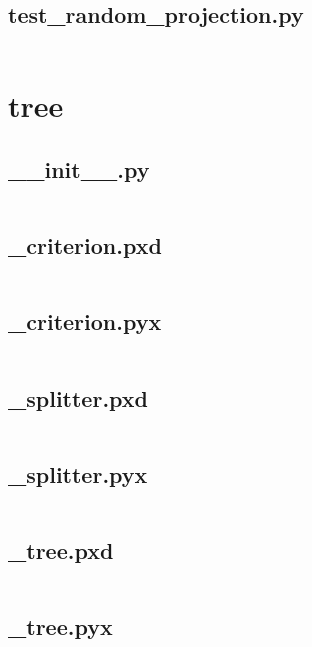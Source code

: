 \documentclass{article}
\begin{document}
\subsection{test\_random\_projection.py}
\inputminted{python}{/home/dufferzafar/dev/@clones/scikit-learn/sklearn/tests/test_random_projection.py}
\newpage

\section{tree}

\subsection{\_\_init\_\_.py}
\inputminted{python}{/home/dufferzafar/dev/@clones/scikit-learn/sklearn/tree/__init__.py}
\newpage

\subsection{\_criterion.pxd}
\inputminted{cython}{/home/dufferzafar/dev/@clones/scikit-learn/sklearn/tree/_criterion.pxd}
\newpage

\subsection{\_criterion.pyx}
\inputminted{cython}{/home/dufferzafar/dev/@clones/scikit-learn/sklearn/tree/_criterion.pyx}
\newpage

\subsection{\_splitter.pxd}
\inputminted{cython}{/home/dufferzafar/dev/@clones/scikit-learn/sklearn/tree/_splitter.pxd}
\newpage

\subsection{\_splitter.pyx}
\inputminted{cython}{/home/dufferzafar/dev/@clones/scikit-learn/sklearn/tree/_splitter.pyx}
\newpage

\subsection{\_tree.pxd}
\inputminted{cython}{/home/dufferzafar/dev/@clones/scikit-learn/sklearn/tree/_tree.pxd}
\newpage

\subsection{\_tree.pyx}
\inputminted{cython}{/home/dufferzafar/dev/@clones/scikit-learn/sklearn/tree/_tree.pyx}
\newpage
\end{document}
